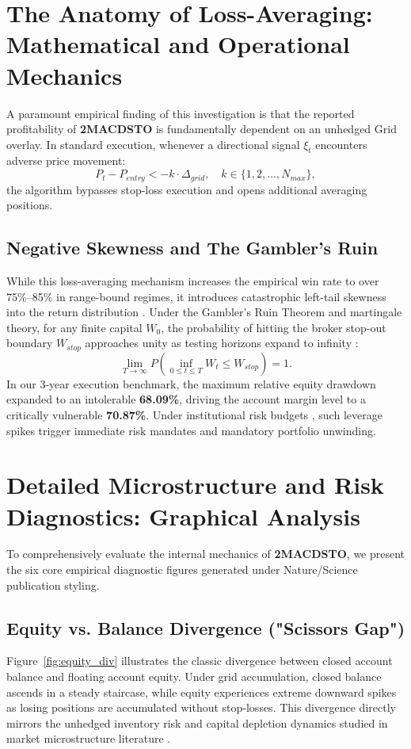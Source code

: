 \documentclass[11pt,a4paper]{article}
\begin{document}
\section{The Anatomy of Loss-Averaging: Mathematical and Operational Mechanics}
A paramount empirical finding of this investigation is that the reported profitability of \textbf{2MACDSTO} is fundamentally dependent on an unhedged Grid overlay. In standard execution, whenever a directional signal $\xi_t$ encounters adverse price movement:
\begin{equation}
P_t - P_{entry} < -k \cdot \Delta_{grid}, \quad k \in \{1, 2, \dots, N_{max}\},
\end{equation}
the algorithm bypasses stop-loss execution and opens additional averaging positions. 

\subsection{Negative Skewness and The Gambler's Ruin}
While this loss-averaging mechanism increases the empirical win rate to over 75\%--85\% in range-bound regimes, it introduces catastrophic left-tail skewness into the return distribution \cite{bouchaud2003theory, cont2001empirical}. Under the Gambler's Ruin Theorem and martingale theory, for any finite capital $W_0$, the probability of hitting the broker stop-out boundary $W_{stop}$ approaches unity as testing horizons expand to infinity \cite{bouchaud2009markets}:
\begin{equation}
\lim_{T \to \infty} P\left(\inf_{0 \le t \le T} W_t \le W_{stop}\right) = 1.
\end{equation}
In our 3-year execution benchmark, the maximum relative equity drawdown expanded to an intolerable \textbf{68.09\%}, driving the account margin level to a critically vulnerable \textbf{70.87\%}. Under institutional risk budgets \cite{rockafellar2000optimization, shleifer1997limits}, such leverage spikes trigger immediate risk mandates and mandatory portfolio unwinding.


\section{Detailed Microstructure and Risk Diagnostics: Graphical Analysis}
To comprehensively evaluate the internal mechanics of \textbf{2MACDSTO}, we present the six core empirical diagnostic figures generated under Nature/Science publication styling.

\subsection{Equity vs. Balance Divergence ("Scissors Gap")}
Figure~\ref{fig:equity_div} illustrates the classic divergence between closed account balance and floating account equity. Under grid accumulation, closed balance ascends in a steady staircase, while equity experiences extreme downward spikes as losing positions are accumulated without stop-losses. This divergence directly mirrors the unhedged inventory risk and capital depletion dynamics studied in market microstructure literature \cite{shleifer1997limits, bouchaud2009markets}.
\end{document}
